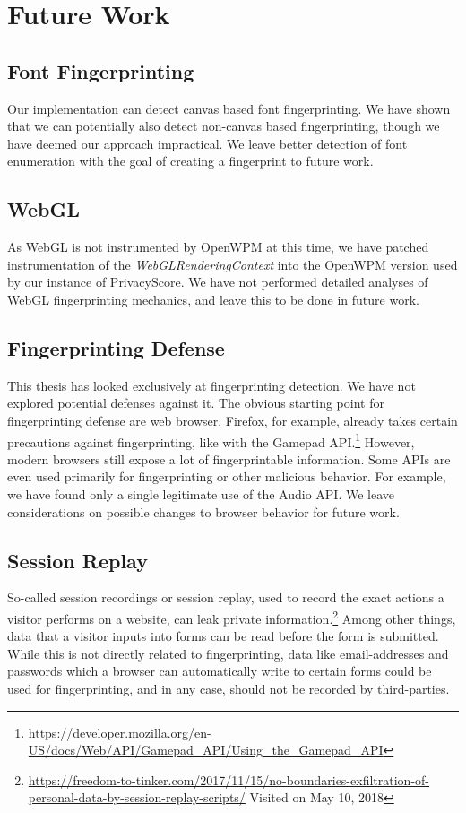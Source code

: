 \documentclass[
    fontsize=12pt,
    headings=small,
    parskip=half,
    bibliography=totoc,
    numbers=noenddot,
    open=any
    ]{scrreprt}
\begin{document}
\section{Future Work}
\subsection{Font Fingerprinting}
Our implementation can detect canvas based font fingerprinting. We have shown that we can
potentially also detect non-canvas based fingerprinting, though we have deemed our approach
impractical. We leave better detection of font enumeration with the goal of creating a fingerprint
to future work.

\subsection{WebGL}
As WebGL is not instrumented by OpenWPM at this time, we have patched instrumentation
of the \textit{WebGLRenderingContext} into the OpenWPM version used by
our instance of PrivacyScore. We have not performed detailed analyses of WebGL fingerprinting
mechanics, and leave this to be done in future work.

\subsection{Fingerprinting Defense}
This thesis has looked exclusively at fingerprinting detection. We have not explored
potential defenses against it. The obvious starting point for fingerprinting defense
are web browser. Firefox, for example, already takes certain precautions against fingerprinting,
like with the Gamepad API.\footnote{\url{https://developer.mozilla.org/en-US/docs/Web/API/Gamepad\_API/Using\_the\_Gamepad\_API}}
However, modern browsers still expose a lot of fingerprintable information.
Some APIs are even used primarily for fingerprinting or other malicious behavior.
For example, we have found only a single legitimate use of the Audio API.
We leave considerations on possible changes to browser behavior for future work.

\subsection{Session Replay}
So-called session recordings or session replay, used to record the exact actions
a visitor performs on a website, can leak private information.\footnote{\url{https://freedom-to-tinker.com/2017/11/15/no-boundaries-exfiltration-of-personal-data-by-session-replay-scripts/} Visited on May 10, 2018}
Among other things, data that a visitor inputs into forms can be read before the form is submitted.
While this is not directly related to fingerprinting, data like email-addresses
and passwords which a browser can automatically write to certain forms could be used
for fingerprinting, and in any case, should not be recorded by third-parties.
\end{document}
